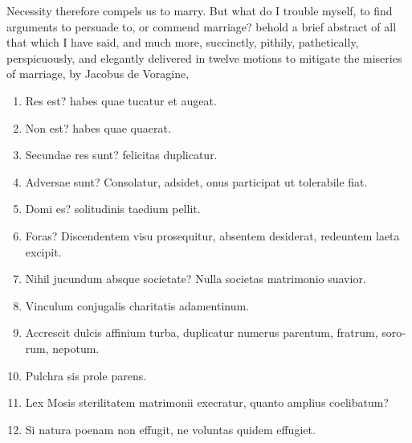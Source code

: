 Necessity therefore compels us to marry.
But what do I trouble myself, to find arguments to persuade to, or
commend marriage? behold a brief abstract of all that which I have
said, and much more, succinctly, pithily, pathetically, perspicuously,
and elegantly delivered in twelve motions to mitigate the miseries of
marriage, by  Jacobus de Voragine,

\begin{latin}
\begin{enumerate}
\item Res est? habes quae tucatur et augeat.
\item Non est? habes quae quaerat.
\item Secundae res sunt? felicitas duplicatur.
\item Adversae sunt? Consolatur, adsidet, onus participat ut tolerabile fiat.
\item Domi es? solitudinis taedium pellit.
\item Foras? Discendentem visu prosequitur, absentem desiderat, redeuntem laeta excipit.
\item Nihil jucundum absque societate? Nulla societas matrimonio suavior.
\item Vinculum conjugalis charitatis adamentinum.
\item Accrescit dulcis affinium turba, duplicatur numerus parentum, fratrum, sororum, nepotum.
\item Pulchra sis prole parens.
\item Lex Mosis sterilitatem matrimonii execratur, quanto amplius coelibatum?
\item Si natura poenam non effugit, ne voluntas quidem effugiet.
\end{enumerate}
\end{latin}
\translationrule%
